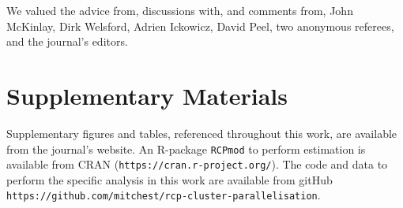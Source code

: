 \documentclass{statsoc}
\begin{document}
We valued the advice from, discussions with, and comments from, John McKinlay, Dirk Welsford, Adrien Ickowicz, David Peel, two anonymous referees, and the journal's editors.

\section*{Supplementary Materials}

Supplementary figures and tables, referenced throughout this work, are available from the journal's website. An R-package \verb|RCPmod| to perform estimation is available from CRAN (\verb|https://cran.r-project.org/|). The code and data to perform the specific analysis in this work are available from gitHub \verb|https://github.com/mitchest/rcp-cluster-parallelisation|.\vspace*{-8pt}



\end{document}
